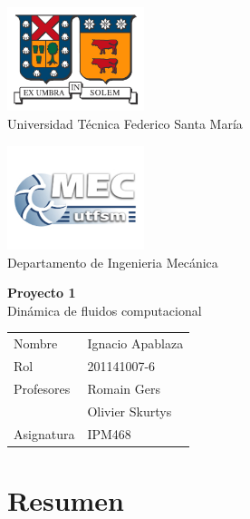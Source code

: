 \documentclass[letterpaper]{article}
\begin{document}
\thispagestyle{empty}

\hspace{-5mm}
\begin{minipage}[c]{7cm}
\centering
\includegraphics[width=4cm]{logoutfsm.jpg} \\
Universidad Técnica Federico Santa María
\end{minipage}
\hfill
\hspace{20mm}
\begin{minipage}[c]{7cm}
\centering
\includegraphics[width=4cm]{logomec1.jpg} \\
Departamento de Ingenieria Mecánica
\end{minipage}

\begin{center}
\vfill
 \Huge{{\bf Proyecto 1 }} \\ \vspace{1cm} 
 \Huge{Dinámica de fluidos computacional}
\vfill
\end{center}

\vfill \hfill
\begin{tabular}{l @{ : } l}
Nombre &   Ignacio Apablaza \\
Rol & 201141007-6  \\
Profesores & Romain Gers \\
			& Olivier Skurtys \\
Asignatura & IPM468 \\
\end{tabular}

\newpage


\tableofcontents


\newpage

\section{Resumen}
\end{document}
